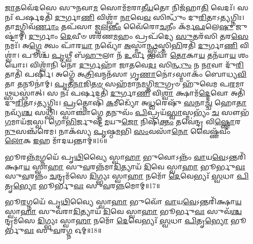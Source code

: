  \ul{𑌜𑌾}\-𑌤𑌵𑍇᳴𑌦𑌸𑍇 𑌸𑍁𑌨𑌵𑌾\-\ul{𑌮} 𑌸𑍋𑌮᳴𑌮𑌰𑌾𑌤𑍀\-\ul{𑌯}\-𑌤𑍋 𑌨𑌿𑌜᳴𑌹𑌾\-\ul{𑌤𑌿} 𑌵𑍇𑌦𑌃᳴। 
 𑌸 𑌨𑌃᳴ 𑌪𑌰𑍍\mbox{}\-\ul{𑌷}\-𑌦𑌤𑌿᳴ \ul{𑌦𑍁}\-𑌰𑍍𑌗𑌾\-\ul{𑌣𑌿} 𑌵𑌿𑌶𑍍𑌵𑌾᳴ \ul{𑌨𑌾}\-𑌵𑍇\-\ul{𑌵} 𑌸𑌿𑌨𑍍𑌧𑍁𑌂᳴ 𑌦𑍁\-\ul{𑌰𑌿}\-𑌤𑌾𑌽\-\ul{𑌤𑍍𑌯}\-𑌗𑍍𑌨𑌿𑌃। 
 𑌤𑌾\-\ul{𑌮}\-𑌗𑍍𑌨𑌿𑌵᳴\-\ul{𑌰𑍍𑌣𑌾𑌂} 𑌤𑌪᳴𑌸𑌾 𑌜𑍍𑌵\-\ul{𑌲}\-\-\ul{𑌨𑍍𑌤𑍀𑌂} 𑌵𑍈᳴𑌰𑍋\-\ul{𑌚}\-𑌨𑍀𑌂 𑌕᳴𑌰𑍍𑌮\-\ul{𑌫}\-𑌲𑍇\-\ul{𑌷𑍁} 𑌜𑍁𑌷𑍍𑌟𑌾॑𑌮𑍍। 
 \ul{𑌦𑍁}\-𑌰𑍍𑌗𑌾𑌂 \ul{𑌦𑍇}\-𑌵𑍀𑍞 𑌶𑌰᳴𑌣\-\ul{𑌮}\-𑌹𑌂 𑌪𑍍𑌰𑌪᳴𑌦𑍍𑌯𑍇 \ul{𑌸𑍁}\-𑌤𑌰᳴𑌸𑌿 𑌤𑌰\-\ul{𑌸𑍇} 𑌨𑌮𑌃᳴। 
 𑌅\-\ul{𑌗𑍍𑌨𑍇} 𑌤𑍍𑌵𑌂 𑌪𑌾᳴𑌰\-\ul{𑌯𑌾} 𑌨𑌵𑍍𑌯𑍋᳴ \ul{𑌅}\-𑌸𑍍𑌮𑌾\-\ul{𑌨𑍍𑌥𑍍𑌸𑍍𑌵}\-𑌸𑍍𑌤𑌿\-\ul{𑌭𑌿}\-𑌰𑌤𑌿᳴ \ul{𑌦𑍁}\-𑌰𑍍𑌗𑌾\-\ul{𑌣𑌿} 𑌵𑌿𑌶𑍍𑌵𑌾॑। 
 𑌪𑍂𑌶𑍍𑌚᳴ \ul{𑌪𑍃}\-𑌥𑍍𑌵𑍀 𑌬᳴\-\ul{𑌹𑍁}\-𑌲𑌾 𑌨᳴ \ul{𑌉}\-𑌰𑍍𑌵𑍀 𑌭𑌵𑌾᳴ \ul{𑌤𑍋}\-𑌕𑌾\-\ul{𑌯} 𑌤𑌨᳴𑌯𑌾\-\ul{𑌯} 𑌶𑌂 𑌯𑍋𑌃। 
 𑌵𑌿𑌶𑍍𑌵𑌾᳴𑌨𑌿 𑌨𑍋 \ul{𑌦𑍁}\-𑌰𑍍𑌗𑌹𑌾᳴ 𑌜𑌾𑌤𑌵𑍇\-\ul{𑌦𑌃} 𑌸𑌿\-\ul{𑌨𑍍𑌧𑍁𑌂} 𑌨 \ul{𑌨𑌾}\-𑌵𑌾 𑌦𑍁᳴\-\ul{𑌰𑌿}\-𑌤𑌾𑌤𑌿᳴ 𑌪𑌰𑍍\mbox{}𑌷𑌿। 
 𑌅𑌗𑍍𑌨𑍇᳴ 𑌅\-\ul{𑌤𑍍𑌰𑌿}\-𑌵𑌨𑍍𑌮𑌨᳴𑌸𑌾 𑌗𑍃\-\ul{𑌣𑌾}\-𑌨𑍋॑𑌽𑌸𑍍𑌮𑌾𑌕𑌂᳴ 𑌬𑍋𑌧𑍍𑌯\-\ul{𑌵𑌿}\-𑌤𑌾 \ul{𑌤}\-𑌨𑍂𑌨𑌾॑𑌮𑍍। 
 \ul{𑌪𑍃}\-\-\ul{𑌤}\-\-\ul{𑌨𑌾}\-𑌜𑌿\-\ul{𑌤}\-\-\ul{𑍞} 𑌸𑌹᳴𑌮𑌾𑌨\-\ul{𑌮}\-𑌗𑍍𑌨𑌿\-\ul{𑌮𑍁}\-𑌗𑍍𑌰𑍞 𑌹𑍁᳴𑌵𑍇𑌮 𑌪\-\ul{𑌰}\-𑌮𑌾\-\ul{𑌥𑍍𑌸}\-𑌧𑌸𑍍𑌥𑌾॑𑌤𑍍। 
 𑌸 𑌨𑌃᳴ 𑌪𑌰𑍍\mbox{}\-\ul{𑌷}\-𑌦𑌤𑌿᳴ \ul{𑌦𑍁}\-𑌰𑍍𑌗𑌾\-\ul{𑌣𑌿} 𑌵𑌿\-\ul{𑌶𑍍𑌵𑌾} 𑌕𑍍𑌷𑌾𑌮᳴\-\ul{𑌦𑍍𑌦𑍇}\-𑌵𑍋 𑌅𑌤𑌿᳴ 𑌦𑍁\-\ul{𑌰𑌿}\-𑌤𑌾𑌽\-\ul{𑌤𑍍𑌯}\-𑌗𑍍𑌨𑌿𑌃। 
 \ul{𑌪𑍍𑌰}\-𑌤𑍍𑌨𑍋𑌷𑌿᳴ \ul{𑌕}\-𑌮𑍀𑌡𑍍𑌯𑍋᳴ 𑌅\-\ul{𑌧𑍍𑌵}\-𑌰𑍇𑌷𑍁᳴ \ul{𑌸}\-𑌨𑌾\-\ul{𑌚𑍍𑌚} 𑌹𑍋\-\ul{𑌤𑌾} 𑌨𑌵𑍍𑌯᳴\-\ul{𑌶𑍍𑌚} 𑌸𑌥𑍍𑌸𑌿᳴। 
 𑌸𑍍𑌵𑌾𑌞𑍍𑌚𑌾॑𑌗𑍍𑌨𑍇 \ul{𑌤}\-𑌨𑍁𑌵𑌂᳴ \ul{𑌪𑌿}\-𑌪𑍍𑌰𑌯᳴\-\ul{𑌸𑍍𑌵𑌾}\-𑌸𑍍𑌮𑌭𑍍𑌯𑌂᳴ \ul{𑌚} 𑌸𑍗𑌭᳴\-\ul{𑌗}\-𑌮𑌾𑌯᳴𑌜𑌸𑍍𑌵। 
 𑌗𑍋\-\ul{𑌭𑌿}\-𑌰𑍍𑌜𑍁𑌷𑍍𑌟᳴\-\ul{𑌮}\-𑌯𑍁\-\ul{𑌜𑍋} 𑌨𑌿𑌷𑌿᳴\-\ul{𑌕𑍍𑌤𑌂} 𑌤𑌵𑍇॑𑌨𑍍𑌦𑍍𑌰 𑌵𑌿\-\ul{𑌷𑍍𑌣𑍋}\-𑌰\-\ul{𑌨𑍁}\-𑌸𑌞𑍍𑌚᳴𑌰𑍇𑌮। 
 𑌨𑌾𑌕᳴𑌸𑍍𑌯 \ul{𑌪𑍃}\-𑌷𑍍𑌠\-\ul{𑌮}\-𑌭𑌿 \ul{𑌸𑌂}\-𑌵𑌸𑌾᳴\-\ul{𑌨𑍋} 𑌵𑍈𑌷𑍍𑌣᳴𑌵𑍀𑌂 \ul{𑌲𑍋}\-𑌕 \ul{𑌇}\-𑌹 𑌮𑌾᳴𑌦𑌯𑌨𑍍𑌤𑌾𑌮𑍍॥16॥
\anuvakamend%


𑌭𑍂𑌰𑌨𑍍𑌨᳴\-\ul{𑌮}\-𑌗𑍍𑌨𑌯𑍇᳴ 𑌪𑍃\-\ul{𑌥𑌿}\-𑌵𑍍𑌯𑍈 𑌸𑍍𑌵𑌾\-\ul{𑌹𑌾} 𑌭𑍁𑌵𑍋𑌽𑌨𑍍𑌨𑌂᳴ \ul{𑌵𑌾}\-𑌯\-\ul{𑌵𑍇}\-𑌽𑌨𑍍𑌤𑌰𑌿᳴𑌕𑍍𑌷𑌾\-\ul{𑌯} 𑌸𑍍𑌵𑌾\-\ul{𑌹𑌾} 𑌸𑍁\-\ul{𑌵}\-𑌰𑌨𑍍𑌨᳴𑌮𑌾\-\ul{𑌦𑌿}\-𑌤𑍍𑌯𑌾𑌯᳴ \ul{𑌦𑌿}\-𑌵𑍇 𑌸𑍍𑌵𑌾\-\ul{𑌹𑌾} 𑌭𑍂𑌰𑍍𑌭𑍁\-\ul{𑌵𑌃} 𑌸𑍁\-\ul{𑌵}\-𑌰𑌨𑍍𑌨𑌂᳴ \ul{𑌚}\-𑌨𑍍𑌦𑍍𑌰𑌮᳴𑌸𑍇 \ul{𑌦𑌿}\-𑌗𑍍𑌭𑍍𑌯𑌃 𑌸𑍍𑌵𑌾\-\ul{𑌹𑌾} 𑌨𑌮𑍋᳴ \ul{𑌦𑍇}\-𑌵𑍇𑌭𑍍𑌯𑌃᳴ \ul{𑌸𑍍𑌵}\-𑌧𑌾 \ul{𑌪𑌿}\-𑌤𑍃\-\ul{𑌭𑍍𑌯𑍋} 𑌭𑍂𑌰𑍍𑌭𑍁\-\ul{𑌵𑌃} 𑌸𑍁\-\ul{𑌵}\-𑌰\-\ul{𑌨𑍍𑌨}\-𑌮𑍋𑌮𑍍॥17॥
\anuvakamend

𑌭𑍂\-\ul{𑌰}\-𑌗𑍍𑌨𑌯𑍇᳴ 𑌪𑍃\-\ul{𑌥𑌿}\-𑌵𑍍𑌯𑍈 𑌸𑍍𑌵𑌾\-\ul{𑌹𑌾} 𑌭𑍁𑌵𑍋᳴ \ul{𑌵𑌾}\-𑌯\-\ul{𑌵𑍇}\-𑌽𑌨𑍍𑌤𑌰𑌿᳴𑌕𑍍𑌷𑌾\-\ul{𑌯} 𑌸𑍍𑌵𑌾\-\ul{𑌹𑌾} 𑌸𑍁𑌵᳴𑌰𑌾\-\ul{𑌦𑌿}\-𑌤𑍍𑌯𑌾𑌯᳴ \ul{𑌦𑌿}\-𑌵𑍇 𑌸𑍍𑌵𑌾\-\ul{𑌹𑌾} 𑌭𑍂𑌰𑍍𑌭𑍁\-\ul{𑌵𑌃} 𑌸𑍁𑌵᳴\-\ul{𑌶𑍍𑌚}\-𑌨𑍍𑌦𑍍𑌰𑌮᳴𑌸𑍇 \ul{𑌦𑌿}\-𑌗𑍍𑌭𑍍𑌯𑌃 𑌸𑍍𑌵𑌾\-\ul{𑌹𑌾} 𑌨𑌮𑍋᳴ \ul{𑌦𑍇}\-𑌵𑍇𑌭𑍍𑌯𑌃᳴ \ul{𑌸𑍍𑌵}\-𑌧𑌾 \ul{𑌪𑌿}\-𑌤𑍃\-\ul{𑌭𑍍𑌯𑍋} 𑌭𑍂𑌰𑍍𑌭𑍁\-\ul{𑌵𑌃} 𑌸𑍁\-\ul{𑌵}\-𑌰\-\ul{𑌗𑍍𑌨} 𑌓𑌮𑍍॥18॥
\anuvakamend


